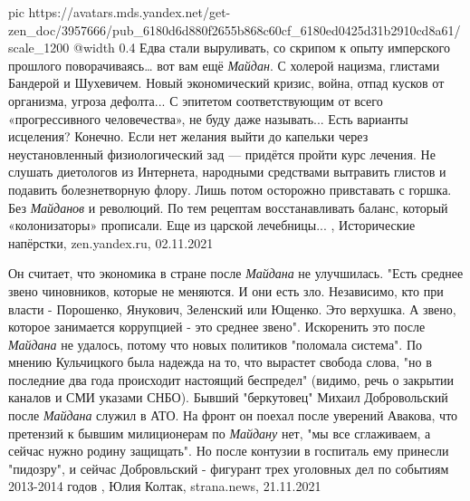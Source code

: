 \ifcmt
  pic https://avatars.mds.yandex.net/get-zen_doc/3957666/pub_6180d6d880f2655b868c60cf_6180ed0425d31b2910cd8a61/scale_1200
  @width 0.4
\fi
Едва стали выруливать, со скрипом к опыту имперского прошлого поворачиваясь…
вот вам ещё \emph{Майдан}. С холерой нацизма, глистами Бандерой и Шухевичем.
Новый экономический кризис, война, отпад кусков от организма, угроза дефолта...
С эпитетом соответствующим от всего «прогрессивного человечества», не буду даже
называть...  Есть варианты исцеления? Конечно. Если нет желания выйти до
капельки через неустановленный физиологический зад — придётся пройти курс
лечения. Не слушать диетологов из Интернета, народными средствами вытравить
глистов и подавить болезнетворную флору. Лишь потом осторожно привставать с
горшка. Без \emph{Майданов} и революций. По тем рецептам восстанавливать
баланс, который «колонизаторы» прописали. Еще из царской лечебницы...
, 
Исторические напёрстки, zen.yandex.ru, 02.11.2021

Он считает, что экономика в стране после \emph{Майдана} не улучшилась. "Есть среднее
звено чиновников, которые не меняются. И они есть зло. Независимо, кто при
власти - Порошенко, Янукович, Зеленский или Ющенко. Это верхушка. А звено,
которое занимается коррупцией - это среднее звено".  Искоренить это после
\emph{Майдана} не удалось, потому что новых политиков "поломала система". По
мнению Кульчицкого была надежда на то, что вырастет свобода слова, "но в
последние два года происходит настоящий беспредел" (видимо, речь о закрытии
каналов и СМИ указами СНБО).  Бывший "беркутовец" Михаил Добровольский после
\emph{Майдана} служил в АТО. На фронт он поехал после уверений Авакова, что
претензий к бывшим милиционерам по \emph{Майдану} нет, "мы все сглаживаем, а
сейчас нужно родину защищать".  Но после контузии в госпиталь ему принесли
"пидозру", и сейчас Добровльский - фигурант трех уголовных дел по событиям
2013-2014 годов
, 
Юлия Колтак, strana.news, 21.11.2021
